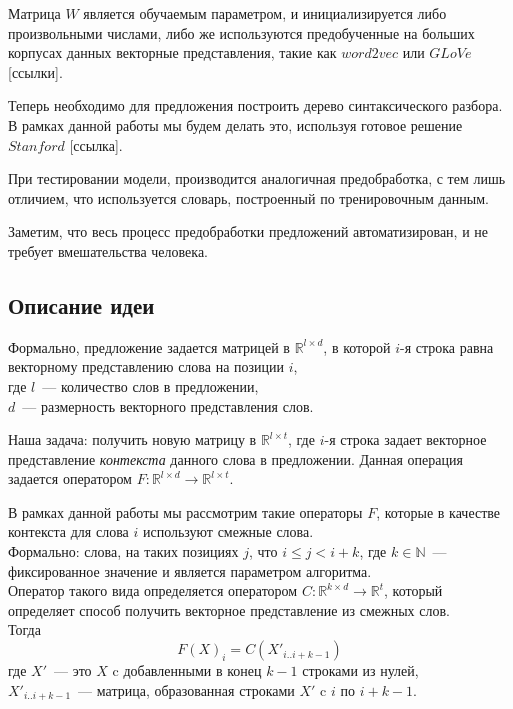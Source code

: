 Матрица $W$ является обучаемым параметром, и инициализируется либо произвольными числами, 
либо же используются предобученные на больших корпусах данных векторные представления, 
такие как $word2vec$ или $GLoVe$ [ссылки].

Теперь необходимо для предложения построить дерево синтаксического разбора.
В рамках данной работы мы будем делать это, используя готовое решение $Stanford$ [ссылка].

При тестировании модели, производится аналогичная предобработка, 
с тем лишь отличием, что используется словарь, построенный по тренировочным данным.

Заметим, что весь процесс предобработки предложений автоматизирован, 
и не требует вмешательства человека.

\subsection{Описание идеи }

Формально, предложение задается матрицей в  $\mathbb{R}^{l \times{} d}$, в которой $i$-я строка равна векторному представлению слова на позиции $i$,\\
где $l$~--- количество слов в предложении,\\
$d$~--- размерность векторного представления слов. 

Наша задача: получить новую матрицу в $\mathbb{R}^{l \times {} t}$, где $i$-я строка задает векторное представление \textit{контекста} данного слова в предложении. 
Данная операция задается оператором $F:\mathbb{R}^{l \times d} \to \mathbb{R}^{l \times t}$.

В рамках данной работы мы рассмотрим такие операторы $F$, которые в качестве контекста
для слова $i$ используют смежные слова.\\
Формально: слова, на таких позициях $j$, что $i \le j < i + k$, где $k \in \mathbb{N}$~--- фиксированное значение и является параметром алгоритма.\\Оператор такого вида определяется оператором
$C:\mathbb{R}^{k \times d} \to \mathbb{R}^t$, который определяет способ 
получить векторное представление из смежных слов. \\
Тогда $$F(X)_i = C(X'_{i..i+k-1})$$
где $X'$~--- это $X$ c добавленными в конец $k-1$ строками из нулей, \\
$X'_{i..i+k-1}$~--- матрица, образованная строками $X'$ c $i$ по $i+k-1$.\par

